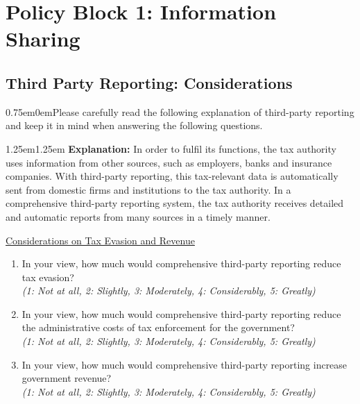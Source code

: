 \documentclass[11pt]{article}
\begin{document}
\section*{Policy Block 1: Information Sharing}
\subsection*{Third Party Reporting: Considerations}
\begin{adjustwidth}{0.75em}{0em}Please carefully read the following explanation of third-party reporting and keep it in mind when answering the following questions.\end{adjustwidth} 
\vspace{0.5em}
\begin{adjustwidth}{1.25em}{1.25em}  \textbf{Explanation:} In order to fulfil its functions, the tax authority uses information from other sources, such as employers, banks and insurance companies. With third-party reporting, this tax-relevant data is automatically sent from domestic firms and institutions to the tax authority. In a comprehensive third-party reporting system, the tax authority receives detailed and automatic reports from many sources in a timely manner.
\\
\end{adjustwidth}
\underline{Considerations on Tax Evasion and Revenue}
\begin{enumerate}[resume]
    \item In your view, how much would comprehensive third-party reporting reduce tax evasion? \\
    \textit{(1: Not at all, 2: Slightly, 3: Moderately, 4: Considerably, 5: Greatly)} 
    \item In your view, how much would comprehensive third-party reporting reduce the administrative costs of tax enforcement for the government?\\
    \textit{(1: Not at all, 2: Slightly, 3: Moderately, 4: Considerably, 5: Greatly)} 
    \item In your view, how much would comprehensive third-party reporting increase government revenue?  \\
    \textit{(1: Not at all, 2: Slightly, 3: Moderately, 4: Considerably, 5: Greatly)} 
\end{enumerate}
\end{document}
